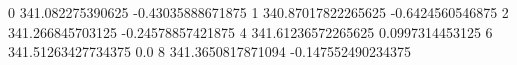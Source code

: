 0 341.082275390625 -0.43035888671875
1 340.87017822265625 -0.6424560546875
2 341.266845703125 -0.24578857421875
4 341.61236572265625 0.0997314453125
6 341.51263427734375 0.0
8 341.3650817871094 -0.147552490234375
